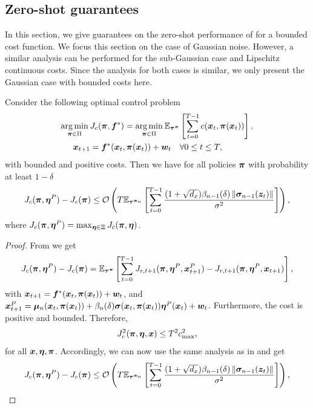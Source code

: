 \subsection{Zero-shot guarantees} \label{sec:zero_shot_performance_theory}
In this section, we give guarantees on the zero-shot performance of \opacex for a bounded cost function. We focus this section on the case of Gaussian noise. However, a similar analysis can be performed for the sub-Gaussian case and Lipschitz continuous costs. Since the analysis for both cases is similar, we only present the Gaussian case with bounded costs here.
\begin{corollary}\label{cor:pessimistic policy difference}
    Consider the following optimal control problem
\begin{align}
        \label{eq:oc_cost}
    \underset{{\bm{\pi}} \in \Pi}{\arg\min} \hspace{0.2em} &J_c({\bm{\pi}}, {\bm{f}}^*) = \underset{{\bm{\pi}} \in \Pi} {\arg\min} \hspace{0.2em}\mathbb{E}_{{\bm{\tau}}^{{\bm{\pi}}}}\left[\sum^{T-1}_{t=0} c({\bm{x}}_t, {\bm{\pi}}({\bm{x}}_t)) \right], \\
        {\bm{x}}_{t+1} &= {\bm{f}}^*({\bm{x}}_t, {\bm{\pi}}({\bm{x}}_t)) + {\bm{w}}_t \quad \forall 0\leq t\leq T, \notag 
\end{align}
with bounded and positive costs.
Then we have for all policies ${\bm{\pi}}$ with probability at least $1-\delta$
\begin{equation*}
    J_c({\bm{\pi}}, {\bm{\eta}}^{P}) - J_c({\bm{\pi}}) \leq  {\mathcal{O}}\left(T \mathbb{E}_{{\bm{\tau}}^{{\bm{\pi}}_n}} \left[\sum^{T-1}_{t=0} \frac{(1 + \sqrt{d_x}) \beta_{n-1}(\delta) \left\lVert{\bm{\sigma}}_{n-1}({\bm{z}}_{ t})\right\rVert}{\sigma^2}\right]\right),
\end{equation*}
where $J_c({\bm{\pi}}, {\bm{\eta}}^{P})  = \max_{{\bm{\eta}} \in \Xi} J_c({\bm{\pi}}, {\bm{\eta}})$. 
\end{corollary}

\begin{proof}
From  we get
\begin{equation*}
    J_c ({\bm{\pi}}, {\bm{\eta}}^P) - J_c ({\bm{\pi}}) = \mathbb{E}_{{\bm{\tau}}^{{\bm{\pi}}}}  \left[\sum^{T-1}_{t=0} J_{r, t+1}({\bm{\pi}}, {\bm{\eta}}^P, {\bm{x}}^P_{t+1}) -  J_{r, t+1}({\bm{\pi}}, {\bm{\eta}}^P, {\bm{x}}_{t+1})\right],
\end{equation*}
with ${\bm{x}}_{t+1} =  {\bm{f}}^*({\bm{x}}_t, {\bm{\pi}}({\bm{x}}_t)) + {\bm{w}}_t$, and ${\bm{x}}^P_{t+1} = {\bm{\mu}}_n({\bm{x}}_t, {\bm{\pi}}({\bm{x}}_t)) + \beta_n(\delta) {\bm{\sigma}}({\bm{x}}_t, {\bm{\pi}}({\bm{x}}_t)){\bm{\eta}}^P({\bm{x}}_t) + {\bm{w}}_t$.
Furthermore, the cost is positive and bounded. Therefore,
\begin{equation*}
    J^2_c({\bm{\pi}}, {\bm{\eta}}, {\bm{x}}) \leq T^2 c_{\max}^2,
\end{equation*}
for all ${\bm{x}}, {\bm{\eta}}, {\bm{\pi}}$.
Accordingly, we can now use the same analysis as in  and get  
\begin{equation*}
    J_c({\bm{\pi}}, {\bm{\eta}}^{P}) - J_c({\bm{\pi}})  \leq  {\mathcal{O}}\left(T \mathbb{E}_{{\bm{\tau}}^{{\bm{\pi}}_n}} \left[\sum^{T-1}_{t=0} \frac{(1 + \sqrt{d_x}) \beta_{n-1}(\delta) \left\lVert{\bm{\sigma}}_{n-1}({\bm{z}}_{ t})\right\rVert}{\sigma^2}\right]\right),
\end{equation*}
\end{proof}

